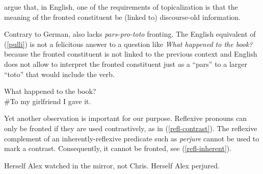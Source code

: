 \documentclass[output=paper]{langsci/langscibook}
\begin{document}
\cite{Ward:Birner:94} argue that, in English, one of the requirements of topicali\-zation is that the meaning of the fronted constituent be (linked to) discourse-old information.

Contrary to German,  also lacks \textit{pars-pro-toto} fronting. The English equivalent of (\ref{pulli}) is not a felicitous answer to a question like \textit{What happened to the book?} because the fronted constituent is not linked to the previous context and English does not allow to interpret the fronted constituent just as a ``pars'' to a larger ``toto'' that would include the verb.

\begin{exe}
\ex What happened to the book?\\
\#To my girlfriend I gave it.\label{en-pars}
\end{exe}

Yet another observation is important for our purpose. Reflexive pronouns can only be fronted if they are used contrastively, as in (\ref{refl-contrast}). The reflexive complement of an inherently-reflexive predicate such as \textit{perjure} cannot be used to mark a contrast. Consequently, it cannot be fronted, see (\ref{refl-inherent}).

\begin{exe}
\ex\label{reflexive}
\begin{xlist}
\ex Herself Alex watched in the mirror, not Chris.\label{refl-contrast}
\ex *Herself Alex perjured. \label{refl-inherent}
\end{xlist}
\end{exe}
\end{document}

